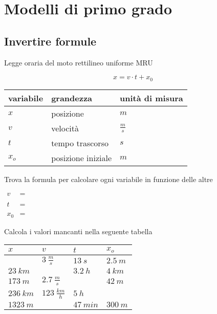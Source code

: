 \section{Modelli di primo  grado}

\subsection{Invertire formule} 
\begin{questions}
	
	\question Legge oraria del moto rettilineo uniforme MRU 
	
	\begin{equation*}
	x=v \cdot t + x_0
	\end{equation*}
	
	\begin{center}
		\renewcommand\arraystretch{1.2}	
		\begin{tabular}{lll}
			\hline
			variabile & grandezza & unità di misura \\
			\hline		
			$x$ & posizione & $\si{m}$ \\
			$v$ & velocità & $\si{\frac{m}{s}}$ \\
			$t$ & tempo trascorso & $\si{s}$ \\
			$x_o$ & posizione iniziale & $\si{m}$\\
			\hline
		\end{tabular}
	\end{center}
	
	
	
	\begin{parts}	
		\item Trova la formula per calcolare ogni variabile in funzione delle altre
		
		
		
		$
		\begin{aligned}
		v & =\\
		&\\
		t & =\\
		&\\
		x_0 & =
		\end{aligned}
		$
		
		
		
		\item Calcola i valori mancanti nella seguente tabella
		
		\bigskip
		
		\renewcommand\arraystretch{2.2}
		\begin{tabular}{|C{3cm}|C{3cm}|C{3cm}|C{3cm}|}
			\hline
			$x$ & $v$ & $t$ & $x_o$ \\
			\hline
			& $\SI{3}{\frac{m}{s}}$ & $\SI{13}{s}$ & $\SI{2.5}{m}$ \\
			$\SI{23}{km}$ &  & $\SI{3.2}{h}$ & $\SI{4}{km}$ \\
			$\SI{173}{m}$ & $\SI{2.7}{\frac{m}{s}}$ &  & $\SI{42}{m}$ \\
			$\SI{236}{km}$ & $\SI{123}{\frac{km}{h}}$ & $\SI{5}{h}$ &  \\
			$\SI{1323}{m}$ &  & $\SI{47}{min}$ & $\SI{300}{m}$ \\
			\hline
		\end{tabular}	
		

\end{parts}
\end{questions}
